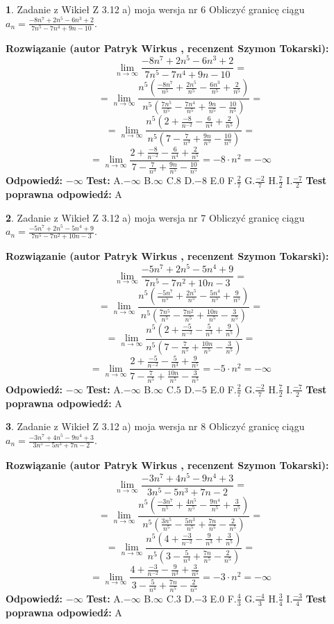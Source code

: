\documentclass[12pt, a4paper]{article}
\theoremstyle{definition} %
\newtheorem{zad}{}
\newcommand{\zadStart}[1]{\begin{zad}#1\newline}
\newcommand{\zadStop}{\end{zad}}
\newcommand{\rozwStart}[2]{\noindent \textbf{Rozwiązanie (autor #1 , recenzent #2): }\newline}
\newcommand{\rozwStop}{\newline}
\newcommand{\odpStart}{\noindent \textbf{Odpowiedź:}\newline}
\newcommand{\odpStop}{\newline}
\newcommand{\testStart}{\noindent \textbf{Test:}\newline}
\newcommand{\testStop}{\newline}
\newcommand{\kluczStart}{\noindent \textbf{Test poprawna odpowiedź:}\newline}
\newcommand{\kluczStop}{\newline}
\begin{document}
\zadStart{Zadanie z Wikieł Z 3.12 a) moja wersja nr 6}
Obliczyć granicę ciągu $a_{n}=\frac{-8n^{7}+2n^{5}-6n^{3}+2}{7n^{5}-7n^{4}+9n-10}$.
\zadStop
\rozwStart{Patryk Wirkus}{Szymon Tokarski}
$$\lim\limits_{n\to\infty}\frac{-8n^{7}+2n^{5}-6n^{3}+2}{7n^{5}-7n^{4}+9n-10}=$$
$$=\lim\limits_{n\to\infty}\frac{n^{5}\left(\frac{-8n^{7}}{n^{5}}+\frac{2n^{5}}{n^{5}}-\frac{6n^{3}}{n^{5}}+\frac{2}{n^{5}}\right)}{n^{5}\left(\frac{7n^{5}}{n^{5}}-\frac{7n^{4}}{n^{5}}+\frac{9n}{n^{5}}-\frac{10}{n^{5}}\right)}=$$
$$=\lim\limits_{n\to\infty}\frac{n^{5}\left(2+\frac{-8}{n^{-2}}-\frac{6}{n^{4}}+\frac{2}{n^{5}}\right)}
{n^{5}\left(7-\frac{7}{n^{3}}+\frac{9n}{n^{5}}-\frac{10}{n^{5}}\right)}=$$
$$=\lim\limits_{n\to\infty}\frac{2+\frac{-8}{n^{-2}}-\frac{6}{n^{4}}+\frac{2}{n^{5}}}{7-\frac{7}{n^{3}}+\frac{9n}{n^{5}}-\frac{10}{n^{5}}}=-8\cdot n^{2} = -\infty$$
\rozwStop
\odpStart
$-\infty$
\odpStop
\testStart
A.$-\infty$
B.$\infty$
C.$8$
D.$-8$
E.$0$
F.$\frac{2}{7}$
G.$\frac{-2}{7}$
H.$\frac{7}{2}$
I.$\frac{-7}{2}$
\testStop
\kluczStart
A
\kluczStop



\zadStart{Zadanie z Wikieł Z 3.12 a) moja wersja nr 7}
Obliczyć granicę ciągu $a_{n}=\frac{-5n^{7}+2n^{5}-5n^{4}+9}{7n^{5}-7n^{2}+10n-3}$.
\zadStop
\rozwStart{Patryk Wirkus}{Szymon Tokarski}
$$\lim\limits_{n\to\infty}\frac{-5n^{7}+2n^{5}-5n^{4}+9}{7n^{5}-7n^{2}+10n-3}=$$
$$=\lim\limits_{n\to\infty}\frac{n^{5}\left(\frac{-5n^{7}}{n^{5}}+\frac{2n^{5}}{n^{5}}-\frac{5n^{4}}{n^{5}}+\frac{9}{n^{5}}\right)}{n^{5}\left(\frac{7n^{5}}{n^{5}}-\frac{7n^{2}}{n^{5}}+\frac{10n}{n^{5}}-\frac{3}{n^{5}}\right)}=$$
$$=\lim\limits_{n\to\infty}\frac{n^{5}\left(2+\frac{-5}{n^{-2}}-\frac{5}{n^{3}}+\frac{9}{n^{5}}\right)}
{n^{5}\left(7-\frac{7}{n^{5}}+\frac{10n}{n^{5}}-\frac{3}{n^{5}}\right)}=$$
$$=\lim\limits_{n\to\infty}\frac{2+\frac{-5}{n^{-2}}-\frac{5}{n^{3}}+\frac{9}{n^{5}}}{7-\frac{7}{n^{5}}+\frac{10n}{n^{5}}-\frac{3}{n^{5}}}=-5\cdot n^{2} = -\infty$$
\rozwStop
\odpStart
$-\infty$
\odpStop
\testStart
A.$-\infty$
B.$\infty$
C.$5$
D.$-5$
E.$0$
F.$\frac{2}{7}$
G.$\frac{-2}{7}$
H.$\frac{7}{2}$
I.$\frac{-7}{2}$
\testStop
\kluczStart
A
\kluczStop



\zadStart{Zadanie z Wikieł Z 3.12 a) moja wersja nr 8}
Obliczyć granicę ciągu $a_{n}=\frac{-3n^{7}+4n^{5}-9n^{4}+3}{3n^{5}-5n^{3}+7n-2}$.
\zadStop
\rozwStart{Patryk Wirkus}{Szymon Tokarski}
$$\lim\limits_{n\to\infty}\frac{-3n^{7}+4n^{5}-9n^{4}+3}{3n^{5}-5n^{3}+7n-2}=$$
$$=\lim\limits_{n\to\infty}\frac{n^{5}\left(\frac{-3n^{7}}{n^{5}}+\frac{4n^{5}}{n^{5}}-\frac{9n^{4}}{n^{5}}+\frac{3}{n^{5}}\right)}{n^{5}\left(\frac{3n^{5}}{n^{5}}-\frac{5n^{3}}{n^{5}}+\frac{7n}{n^{5}}-\frac{2}{n^{5}}\right)}=$$
$$=\lim\limits_{n\to\infty}\frac{n^{5}\left(4+\frac{-3}{n^{-2}}-\frac{9}{n^{3}}+\frac{3}{n^{5}}\right)}
{n^{5}\left(3-\frac{5}{n^{4}}+\frac{7n}{n^{5}}-\frac{2}{n^{5}}\right)}=$$
$$=\lim\limits_{n\to\infty}\frac{4+\frac{-3}{n^{-2}}-\frac{9}{n^{3}}+\frac{3}{n^{5}}}{3-\frac{5}{n^{4}}+\frac{7n}{n^{5}}-\frac{2}{n^{5}}}=-3\cdot n^{2} = -\infty$$
\rozwStop
\odpStart
$-\infty$
\odpStop
\testStart
A.$-\infty$
B.$\infty$
C.$3$
D.$-3$
E.$0$
F.$\frac{4}{3}$
G.$\frac{-4}{3}$
H.$\frac{3}{4}$
I.$\frac{-3}{4}$
\testStop
\kluczStart
A
\kluczStop
\end{document}
